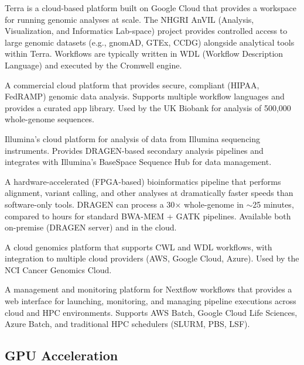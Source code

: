 \begin{description}[style=nextline, itemsep=3pt]
  \item[Terra / AnVIL (Broad Institute)] Terra is a cloud-based platform built on Google Cloud that provides a workspace for running genomic analyses at scale. The NHGRI AnVIL (Analysis, Visualization, and Informatics Lab-space) project provides controlled access to large genomic datasets (e.g., gnomAD, GTEx, CCDG) alongside analytical tools within Terra. Workflows are typically written in WDL (Workflow Description Language) and executed by the Cromwell engine.

  \item[DNAnexus] A commercial cloud platform that provides secure, compliant (HIPAA, FedRAMP) genomic data analysis. Supports multiple workflow languages and provides a curated app library. Used by the UK Biobank for analysis of 500,000 whole-genome sequences.

  \item[Illumina Connected Analytics (ICA)] Illumina's cloud platform for analysis of data from Illumina sequencing instruments. Provides DRAGEN-based secondary analysis pipelines and integrates with Illumina's BaseSpace Sequence Hub for data management.

  \item[Illumina DRAGEN] A hardware-accelerated (FPGA-based) bioinformatics pipeline that performs alignment, variant calling, and other analyses at dramatically faster speeds than software-only tools. DRAGEN can process a 30$\times$ whole-genome in $\sim$25 minutes, compared to hours for standard BWA-MEM + GATK pipelines. Available both on-premise (DRAGEN server) and in the cloud.

  \item[Seven Bridges] A cloud genomics platform that supports CWL and WDL workflows, with integration to multiple cloud providers (AWS, Google Cloud, Azure). Used by the NCI Cancer Genomics Cloud.

  \item[Nextflow Tower / Seqera Platform] A management and monitoring platform for Nextflow workflows that provides a web interface for launching, monitoring, and managing pipeline executions across cloud and HPC environments. Supports AWS Batch, Google Cloud Life Sciences, Azure Batch, and traditional HPC schedulers (SLURM, PBS, LSF).
\end{description}

\subsection{GPU Acceleration}
\label{subsec:emerging:gpu}

